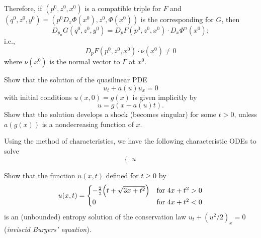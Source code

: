 \begin{solution*}
  Therefore, if \((p^0,z^0,x^0)\) is a compatible triple for \(F\) and
  \((q^0,z^0,y^0)=(p^0D_x\Phi(x^0),z^0,\Phi(x^0))\) is the corresponding
  for \(G\), then
  \[
    D_{p_n}G(q^0,z^0,y^0)=D_pF(p^0,z^0,x^0)\cdot D_x\Phi^n(x^0);
  \]
  i.e.,
  \[
    D_p F(p^0,z^0,x^0)\cdot\nu(x^0)\neq 0
  \]
  where \(\nu(x^0)\) is the normal vector to \(\Gamma\) at \(x^0\).
\end{solution*}

\begin{problem}
  Show that the solution of the quasilinear PDE
  \[
    u_t+a(u)u_x=0
  \]
  with initial conditions \(u(x,0)=g(x)\) is given implicitly by
  \[
    u=g(x-a(u)t).
  \]
  Show that the solution develops a shock (becomes singular) for some
  \(t>0\), unless \(a(g(x))\) is a nondecreasing function of
  \(x\).
\end{problem}
\begin{solution*}
  Using the method of characteristics, we have the following characteristic
  ODEs to solve
  \[
    \left\{
      \begin{aligned}
        u
      \end{aligned}
    \right.
  \]
\end{solution*}

\begin{problem}
  Show that the function \(u(x,t)\) defined for \(t\geq 0\) by
  \[
    u(x,t)=
    \begin{cases}
      -\tfrac{2}{3}\Bigl(t+\sqrt{3x+t^2}\Bigr)
      &\text{for \(4x+t^2>0\)}\\
      0
      &\text{for \(4x+t^2<0\)}
    \end{cases}
  \]
  is an (unbounded) entropy solution of the conservation law
  \(u_t+(u^2/2)_x=0\) (\emph{inviscid Burgers' equation}).
\end{problem}
\begin{solution*}
\end{solution*}

